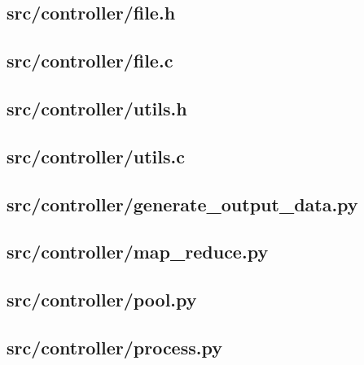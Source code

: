 \subsection{src/controller/file.h}
	
	\newpage

\subsection{src/controller/file.c}
	
	\newpage

\subsection{src/controller/utils.h}
	
	\newpage

\subsection{src/controller/utils.c}
	
	\newpage

\subsection{src/controller/generate\_output\_data.py}
	
	\newpage

\subsection{src/controller/map\_reduce.py}
	
	\newpage

\subsection{src/controller/pool.py}
	
	\newpage

\subsection{src/controller/process.py}
	
	\newpage

